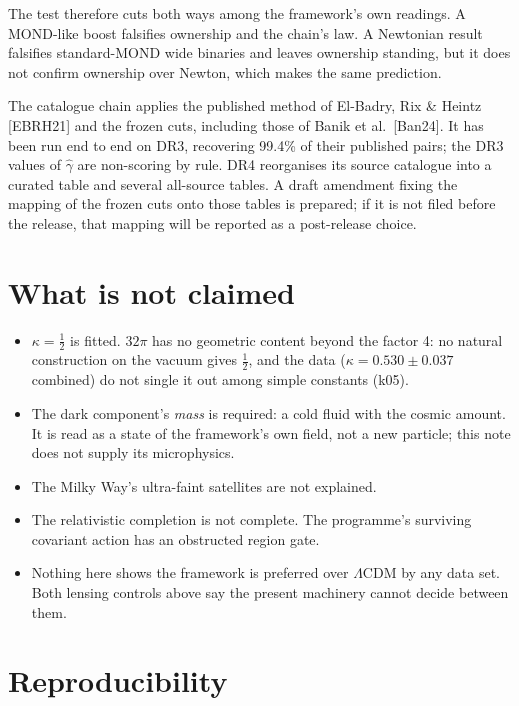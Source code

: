 \documentclass[10pt]{article}
\begin{document}
The test therefore cuts both ways among the framework's own readings. A MOND-like boost falsifies ownership and the chain's law. A Newtonian result falsifies standard-MOND wide binaries and leaves ownership standing, but it does not confirm ownership over Newton, which makes the same prediction.

The catalogue chain applies the published method of El-Badry, Rix \& Heintz [EBRH21] and the frozen cuts, including those of Banik et al.\ [Ban24]. It has been run end to end on DR3, recovering 99.4\% of their published pairs; the DR3 values of $\hat\gamma$ are non-scoring by rule. DR4 reorganises its source catalogue into a curated table and several all-source tables. A draft amendment fixing the mapping of the frozen cuts onto those tables is prepared; if it is not filed before the release, that mapping will be reported as a post-release choice.

\section{What is not claimed}\label{sec:not}

\begin{itemize}
\item $\kappa=\tfrac12$ is fitted. $32\pi$ has no geometric content beyond the factor 4: no natural construction on the vacuum gives $\tfrac12$, and the data ($\kappa=0.530\pm0.037$ combined) do not single it out among simple constants (k05).
\item The dark component's \emph{mass} is required: a cold fluid with the cosmic amount. It is read as a state of the framework's own field, not a new particle; this note does not supply its microphysics.
\item The Milky Way's ultra-faint satellites are not explained.
\item The relativistic completion is not complete. The programme's surviving covariant action has an obstructed region gate.
\item Nothing here shows the framework is preferred over $\Lambda$CDM by any data set. Both lensing controls above say the present machinery cannot decide between them.
\end{itemize}

\section{Reproducibility}\label{sec:repro}
\end{document}
